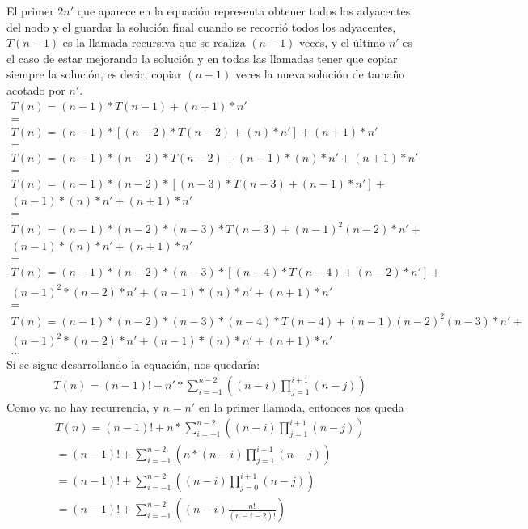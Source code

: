 El primer $2n'$ que aparece en la equaci\'on representa obtener todos los adyacentes del nodo y el guardar la soluci\'on final cuando se recorri\'o todos los adyacentes, $T(n-1)$ es la llamada recursiva que se realiza $(n-1)$ veces, y el \'ultimo $n'$ es el caso de estar mejorando la soluci\'on y en todas las llamadas tener que copiar siempre la soluci\'on, es decir, copiar $(n-1)$ veces la nueva soluci\'on de tama\~no acotado por $n'$.
\begin{equation*}
\begin{split}
T(n) = (n-1)*T(n-1) + (n+1)*n' \\
= \\
T(n) = (n-1)*[(n-2)*T(n-2) + (n)*n'] + (n+1)*n' \\
= \\
T(n) = (n-1)*(n-2)*T(n-2) + (n-1)*(n)*n'+ (n+1)*n' \\
= \\
T(n) = (n-1)*(n-2)*[(n-3)*T(n-3) + (n-1)*n'] + \\
(n-1)*(n)*n'+ (n+1)*n' \\
= \\
T(n) = (n-1)*(n-2)*(n-3)*T(n-3) + (n-1)^2(n-2)*n' + \\
(n-1)*(n)*n' + (n+1)*n' \\
= \\
T(n) = (n-1)*(n-2)*(n-3)*[(n-4)*T(n-4) + (n-2)*n'] + \\
(n-1)^2*(n-2)*n' + (n-1)*(n)*n' + (n+1)*n' \\
= \\
T(n) = (n-1)*(n-2)*(n-3)*(n-4)*T(n-4) + (n-1)(n-2)^2(n-3)*n' + \\
(n-1)^2*(n-2)*n' + (n-1)*(n)*n' + (n+1)*n' \\
\dots
\end{split}
\end{equation*}
Si se sigue desarrollando la equaci\'on, nos quedar\'ia:
\begin{equation*}
\begin{split}
T(n) = (n - 1)! + n'*\sum_{i=-1}^{n-2}((n-i)\prod_{j=1}^{i+1}(n-j))
\end{split}
\end{equation*}
Como ya no hay recurrencia, y $n = n'$ en la primer llamada, entonces nos queda
\begin{equation*}
\begin{split}
T(n) = (n - 1)! + n*\sum_{i=-1}^{n-2}((n-i)\prod_{j=1}^{i+1}(n-j)) \\
= (n - 1)! + \sum_{i=-1}^{n-2}(n*(n-i)\prod_{j=1}^{i+1}(n-j)) \\
= (n - 1)! + \sum_{i=-1}^{n-2}((n-i)\prod_{j=0}^{i+1}(n-j)) \\
= (n - 1)! + \sum_{i=-1}^{n-2}((n-i)\frac{n!}{(n-i-2)!}) \\
\end{split}
\end{equation*}
